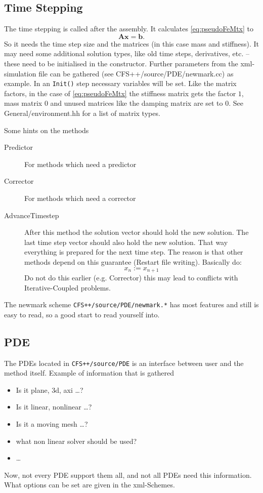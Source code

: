 \subsection{Time Stepping}
\label{sssec:timeStep}
The time stepping is called after the assembly. It calculates
\eqref{eq:pseudoFeMtx} to
\begin{equation}
  \mathbf{Ax}=\mathbf{b}.
  \label{eq:Axb}
\end{equation}
So it needs the time step size and the matrices (in this case mass and
stiffness). It may need some additional solution types, like old time steps,
derivatives, etc. -- these need to be initialised in the constructor. Further
parameters from the xml-simulation file can be gathered (see CFS++/source/PDE/newmark.cc) as
example.
In an \texttt{Init()} step necessary variables will be set. Like the matrix
factors, in the case of \eqref{eq:pseudoFeMtx} the stiffness matrix gets the
factor $1$, mass matrix $0$ and unused matrices like the damping matrix are set
to $0$. See General/environment.hh for a list of matrix types.

Some hints on the methods
\begin{description}
  \item[Predictor] For methods which need a predictor
  \item[Corrector] For methods which need a corrector
  \item[{\color{red} AdvanceTimestep}] After this method the solution vector
    should hold the new solution. The last time step vector should also hold the
    new solution. That way everything is prepared for the next time step. The
    reason is that other methods depend on this guarantee (Restart file writing).
    Basically do:
    \begin{equation}
      x_n := x_{n+1}
    \end{equation}
    Do not do this earlier (e.g. Corrector) this may lead to conflicts with
    Iterative-Coupled problems.
\end{description}
The newmark scheme \texttt{CFS++/source/PDE/newmark.*} has most features and still is easy to
read, so a good start to read yourself into.

\subsection{PDE}
\label{sssec:pde}
The PDEs located in \texttt{CFS++/source/PDE} is an interface between user and
the method itself. Example of information that is gathered
\begin{itemize}
  \item Is it plane, 3d, axi \ldots?
  \item Is it linear, nonlinear \ldots ?
  \item Is it a moving mesh \ldots?
  \item what non linear solver should be used?
  \item \ldots
\end{itemize}
Now, not every PDE support them all, and not all PDEs need this information. What
options can be set are given in the xml-Schemes.


